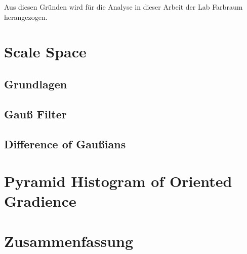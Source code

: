 Aus diesen Gründen wird für die Analyse in dieser Arbeit der Lab Farbraum herangezogen. 

%		



\section{Scale Space}

\blindtext

\subsection{Grundlagen}

\blindtext

\subsection{Gauß Filter}

\blindtext

\subsection{Difference of Gaußians}

\blindtext

\section{Pyramid Histogram of Oriented Gradience}

\blindtext

\section{Zusammenfassung}

\blindtext
